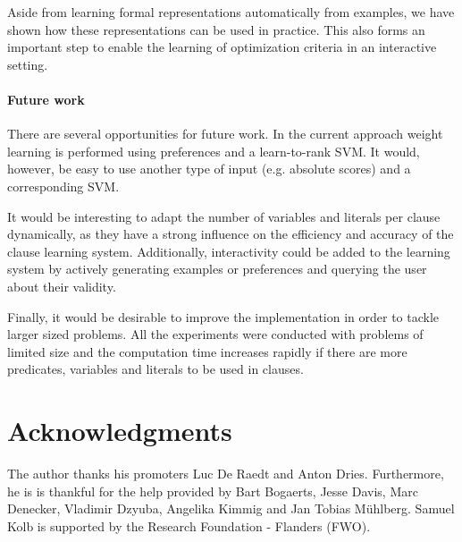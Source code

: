 \documentclass[letterpaper]{article}
\theoremstyle{definition}
\begin{document}
Aside from learning formal representations automatically from examples, we have shown how these representations can be used in practice.
This also forms an important step to enable the learning of optimization criteria in an interactive setting.

\paragraph{Future work}
There are several opportunities for future work.
In the current approach weight learning is performed using preferences and a learn-to-rank SVM.
It would, however, be easy to use another type of input (e.g. absolute scores) and a corresponding SVM.

It would be interesting to adapt the number of variables and literals per clause dynamically, as they have a strong influence on the efficiency and accuracy of the clause learning system.
Additionally, interactivity could be added to the learning system by actively generating examples or preferences and querying the user about their validity.

Finally, it would be desirable to improve the implementation in order to tackle larger sized problems.
All the experiments were conducted with problems of limited size and the computation time increases rapidly if there are more predicates, variables and literals to be used in clauses.

\section*{Acknowledgments}
The author thanks his promoters Luc De Raedt and Anton Dries.
Furthermore, he is is thankful for the help provided by Bart Bogaerts, Jesse Davis, Marc Denecker, Vladimir Dzyuba, Angelika Kimmig and Jan Tobias M\"uhlberg.
Samuel Kolb is supported by the Research Foundation - Flanders (FWO).




\end{document}
